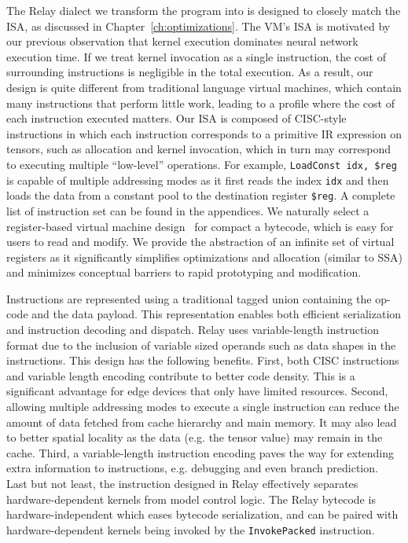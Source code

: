 The Relay dialect we transform the program into
  is designed to closely match the ISA, as discussed in Chapter~\ref{ch:optimizations}.
The VM's ISA is motivated by our previous observation that
  kernel execution dominates neural network execution time.
If we treat kernel invocation as a single instruction,
  the cost of surrounding instructions is negligible in the total execution.
As a result, our design is quite different from traditional language virtual machines,
  which contain many instructions that perform little work,
  leading to a profile where the cost of each instruction executed matters.
Our ISA is composed of CISC-style instructions in which each instruction corresponds to a primitive
  IR expression on tensors, such as allocation and kernel invocation,
  which in turn may correspond to executing multiple ``low-level'' operations.
For example, \texttt{LoadConst idx, \$reg} is capable of multiple addressing modes
  as it first reads the index \texttt{idx} and then loads the data from a constant
  pool to the destination register \texttt{\$reg}.
A complete list of instruction set can be found in the appendices.
We naturally select a register-based virtual machine design~\citep{davis2003case} for compact a bytecode,
  which is easy for users to read and modify.
We provide the abstraction of an infinite set of virtual registers as it significantly simplifies optimizations
  and allocation (similar to SSA) and minimizes conceptual barriers to rapid prototyping and modification.

Instructions are represented using a traditional tagged union containing the op-code and the data payload.
This representation enables both efficient serialization and instruction decoding and dispatch.
Relay uses variable-length instruction format due to the inclusion of variable sized operands such
  as data shapes in the instructions.
This design has the following benefits.
First, both CISC instructions and variable length encoding contribute to better code density.
This is a significant advantage for edge devices that only have limited resources.
Second, allowing multiple addressing modes to execute a single instruction can reduce the amount
  of data fetched from cache hierarchy and main memory.
It may also lead to better spatial locality as
  the data (e.g. the tensor value) may remain in the cache.
Third, a variable-length instruction encoding paves the way
  for extending extra information to instructions,
  e.g. debugging and even branch prediction.
Last but not least, the instruction designed in Relay effectively separates
  hardware-dependent kernels from model control logic.
The Relay bytecode is hardware-independent which eases bytecode serialization,
  and can be paired with hardware-dependent kernels being invoked by the \texttt{InvokePacked} instruction.

